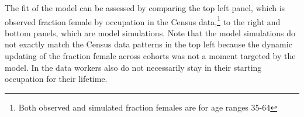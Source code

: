 \documentclass[12pt]{article}
\begin{document}




The fit of the model can be assessed by comparing the top left panel, which is observed fraction female by occupation in the Census data,\footnote{Both observed and simulated fraction females are for age ranges 35-64} to the right and bottom panels, which are model simulations. Note that the model simulations do not exactly match the Census data patterns in the top left because the dynamic updating of the fraction female across cohorts was not a moment targeted by the model. In the data workers also do not necessarily stay in their starting occupation for their lifetime.

\end{document}
